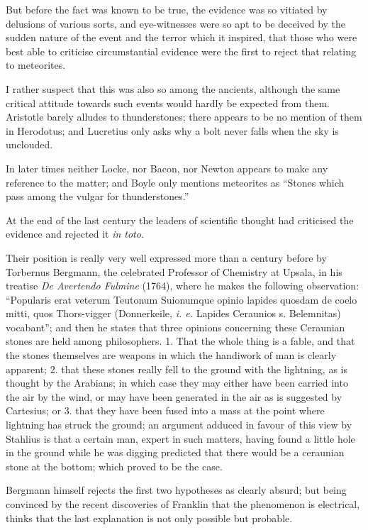 \documentclass[a4paper, 12pt, oneside]{article}
\begin{document}
But before the fact was known to be true, the evidence was so vitiated by delusions of various sorts, and eye-witnesses were so apt to be deceived by the sudden nature of the event and the terror which it inspired, that those who were best able to criticise circumstantial evidence were the first to reject that relating to meteorites. 

I rather suspect that this was also so among the ancients, although the same critical attitude towards such events would hardly be expected from them. Aristotle barely alludes to thunderstones; there appears to be no mention of them in Herodotus; and Lucretius only asks why a bolt never falls when the sky is unclouded. 

In later times neither Locke, nor Bacon, nor Newton appears to make any reference to the matter; and Boyle only mentions meteorites as ``Stones which pass among the vulgar for thunderstones.'' 

At the end of the last century the leaders of scientific thought had criticised the evidence and rejected it \emph{in toto}. 

Their position is really very well expressed more than a century before by Torbernus Bergmann, the celebrated Professor of Chemistry at Upsala, in his treatise \emph{De Avertendo Fulmine} (1764), where he makes the following observation: ``Popularis erat veterum Teutonum Suionumque opinio lapides quosdam de coelo mitti, quos Thors-vigger (Donnerkeile, \emph{i. e.} Lapides Ceraunios s. Belemnitas) vocabant''; and then he states that three opinions concerning these Ceraunian stones are held among philosophers. 1. That the whole thing is a fable, and that the stones themselves are weapons in which the handiwork of man is clearly apparent; 2. that these stones really fell to the ground with the lightning, as is thought by the Arabians; in which case they may either have been carried into the air by the wind, or may have been generated in the air as is suggested by Cartesius; or 3. that they have been fused into a mass at the point where lightning has struck the ground; an argument adduced in favour of this view by Stahlius is that a certain man, expert in such matters, having found a little hole in the ground while he was digging predicted that there would be a ceraunian stone at the bottom; which proved to be the case. 

Bergmann himself rejects the first two hypotheses as clearly absurd; but being convinced by the recent discoveries of Franklin that the phenomenon is electrical, thinks that the last explanation is not only possible but probable. 
\end{document}

